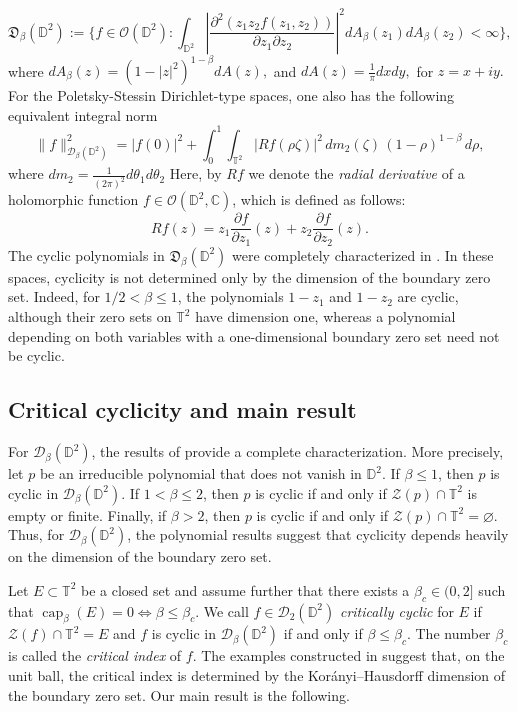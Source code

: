 \documentclass[a4paper,12pt]{amsart}
\theoremstyle{definition}
\begin{document}
\[\mathfrak{D}_{\beta}(\mathbb{D}^2):=\Biggl\{ f\in \mathcal{O}(\mathbb{D}^2):\int_{\mathbb{D}^2}\left|\frac{\partial^2(z_1z_2f(z_1,z_2))}{\partial z_1 \partial z_2}\right|^2dA_{\beta}(z_1)dA_{\beta}(z_2)<\infty\Biggr\},\]
where $dA_{\beta}(z)=(1-|z|^2)^{1-\beta}dA(z),$ and $dA(z)=\frac{1}{\pi}dxdy,$ for $z=x+iy.$
For the Poletsky-Stessin Dirichlet-type spaces, one also has the following equivalent integral norm
\begin{equation} \label{eq: Integral Norm Defn}
\|f\|_{\mathcal D_\beta(\mathbb D^2)}^2
=
|f(0)|^2
+
\int_0^1
\int_{\mathbb T^2}
|Rf(\rho\zeta)|^2
\,dm_2(\zeta)\,
(1-\rho)^{1-\beta}\,d\rho ,
\end{equation}
where $dm_2=\frac{1}{(2\pi)^2}d\theta_1d\theta_2$
Here, by $Rf$ we denote the \textit{radial derivative} of a holomorphic function $f\in\mathcal{O}(\mathbb{D}^2,\mathbb{C})$, which is defined as follows:
    \begin{equation*}
        R f (z) = z_1 \frac{\partial f}{\partial z_1} (z)+z_2 \frac{\partial f}{\partial z_2} (z).
    \end{equation*}
The cyclic polynomials in \(\mathfrak D_\beta(\mathbb D^2)\) were
completely characterized in
\cite{Beneteau2016_TwoVariables,Knese2019_Aniso_Bidisk}. In these
spaces, cyclicity is not determined only by the dimension of the
boundary zero set. Indeed, for \(1/2<\beta\leq1\), the polynomials
\(1-z_1\) and \(1-z_2\) are cyclic, although their zero sets on
\(\mathbb T^2\) have dimension one, whereas a polynomial depending on
both variables with a one-dimensional boundary zero set need not be
cyclic.

\subsection{Critical cyclicity and main result}
For \(\mathcal D_\beta(\mathbb D^2)\), the results of
\cite{Pouriya_FirstPaper,NailwalZalar2026} provide a complete
characterization. More precisely, let \(p\) be an irreducible polynomial that does not
vanish in \(\mathbb D^2\). If \(\beta\leq1\), then \(p\) is cyclic in
\(\mathcal D_\beta(\mathbb D^2)\). If \(1<\beta\leq2\), then \(p\) is cyclic if
and only if \(\mathcal{Z}(p)\cap\mathbb T^2\) is empty or finite. Finally, if
\(\beta>2\), then \(p\) is cyclic if and only if
\(\mathcal{Z}(p)\cap\mathbb T^2=\varnothing\). Thus, for \(\mathcal D_\beta(\mathbb D^2)\),
the polynomial results suggest that cyclicity depends heavily on the
dimension of the boundary zero set.

Let \(E\subset\mathbb T^2\) be a closed set and assume further that there
exists a \(\beta_c\in(0,2]\) such that
$
    \operatorname{cap}_\beta(E)=0
    \Longleftrightarrow
    \beta\leq\beta_c.$
We call \(f\in \mathcal D_2(\mathbb D^2)\) \textit{critically cyclic} for \(E\) if
$
    \mathcal{Z}(f)\cap\mathbb T^2=E
$
and \(f\) is cyclic in \(\mathcal D_\beta(\mathbb D^2)\) if and only if
\(\beta\leq\beta_c\). The number \(\beta_c\) is called the \textit{critical
index} of \(f\). The examples constructed in
\cite{Pouriya_CriticalBall} suggest that, on the unit ball, the
critical index is determined by the Kor\'anyi--Hausdorff dimension of
the boundary zero set. Our main result is the following.
   
\end{document}
